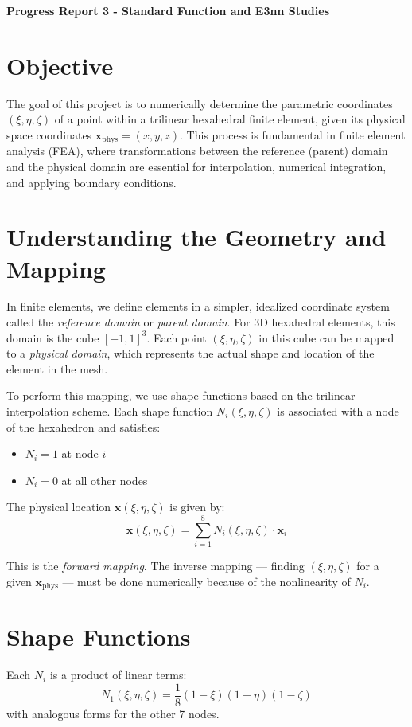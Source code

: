 \documentclass[letterpaper, 11pt]{article}
\begin{document}
	{
		\LARGE
		\textbf{Progress Report 3 - Standard Function and E3nn Studies}
		
	}
		
		\section*{Objective}
		The goal of this project is to numerically determine the parametric coordinates \((\xi, \eta, \zeta)\) of a point within a trilinear hexahedral finite element, given its physical space coordinates \(\mathbf{x}_{\text{phys}} = (x, y, z)\). This process is fundamental in finite element analysis (FEA), where transformations between the reference (parent) domain and the physical domain are essential for interpolation, numerical integration, and applying boundary conditions.
		
		\section*{Understanding the Geometry and Mapping}
		In finite elements, we define elements in a simpler, idealized coordinate system called the \textit{reference domain} or \textit{parent domain}. For 3D hexahedral elements, this domain is the cube \([-1, 1]^3\). Each point \((\xi, \eta, \zeta)\) in this cube can be mapped to a \textit{physical domain}, which represents the actual shape and location of the element in the mesh.
		
		To perform this mapping, we use shape functions based on the trilinear interpolation scheme. Each shape function \(N_i(\xi, \eta, \zeta)\) is associated with a node of the hexahedron and satisfies:
		\begin{itemize}
			\item \(N_i = 1\) at node \(i\)
			\item \(N_i = 0\) at all other nodes
		\end{itemize}
		
		The physical location \(\mathbf{x}(\xi, \eta, \zeta)\) is given by:
		\[
		\mathbf{x}(\xi, \eta, \zeta) = \sum_{i=1}^{8} N_i(\xi, \eta, \zeta) \cdot \mathbf{x}_i
		\]
		
		This is the \textit{forward mapping}. The inverse mapping --- finding \((\xi, \eta, \zeta)\) for a given \(\mathbf{x}_{\text{phys}}\) --- must be done numerically because of the nonlinearity of \(N_i\).
		
		\section*{Shape Functions}
		Each \(N_i\) is a product of linear terms:
		\[
		N_1(\xi, \eta, \zeta) = \frac{1}{8}(1 - \xi)(1 - \eta)(1 - \zeta)
		\]
		with analogous forms for the other 7 nodes.
		
\end{document}
